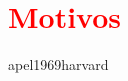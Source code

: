 \section{\textcolor{red}{Motivos}}

\cite[pp. 984]{latham2008diccionario}
\cite{pp. 545}{apel1969harvard}
